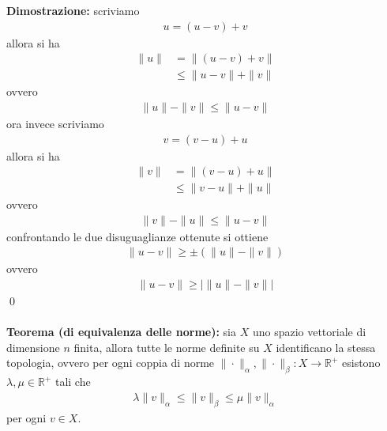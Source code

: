 \documentclass{article}
\numberwithin{equation}{subsection}
\begin{document}
\textbf{Dimostrazione:} scriviamo
\begin{align*}
    u = (u - v) + v 
\end{align*}
allora si ha
\begin{align*}
    \|u\| &= \|(u - v) + v\|  \\
    &\leq \|u - v\| + \|v\| 
\end{align*}
ovvero
\begin{align*}
    \|u\| - \|v\| \leq \|u - v\| 
\end{align*}
ora invece scriviamo
\begin{align*}
    v = (v - u) + u 
\end{align*}
allora si ha
\begin{align*}
    \|v\| &= \|(v - u) + u\|  \\
    &\leq \|v - u\| + \|u\| 
\end{align*}
ovvero
\begin{align*}
    \|v\| - \|u\| \leq \|u - v\| 
\end{align*}
confrontando le due disuguaglianze ottenute si ottiene
\begin{align*}
    \|u - v\| \geq \pm(\|u\| - \|v\|) 
\end{align*}
ovvero
\begin{align*}
    \|u - v\| \geq |\|u\| - \|v\|| 
\end{align*}  \qed  \\ \\
\textbf{Teorema (di equivalenza delle norme):} sia $X$ uno spazio vettoriale di dimensione $n$ finita, allora tutte le norme definite su $X$ identificano la stessa topologia, ovvero per ogni coppia di norme $\|\cdot\|_\alpha, \|\cdot\|_\beta : X \longrightarrow \mathbb{R}^+$ esistono $\lambda, \mu \in \mathbb{R}^+$ tali che
\begin{gather*}
    \lambda\|v\|_\alpha \leq \|v\|_\beta \leq \mu\|v\|_\alpha 
\end{gather*}
per ogni $v \in X$. \\
\end{document}
